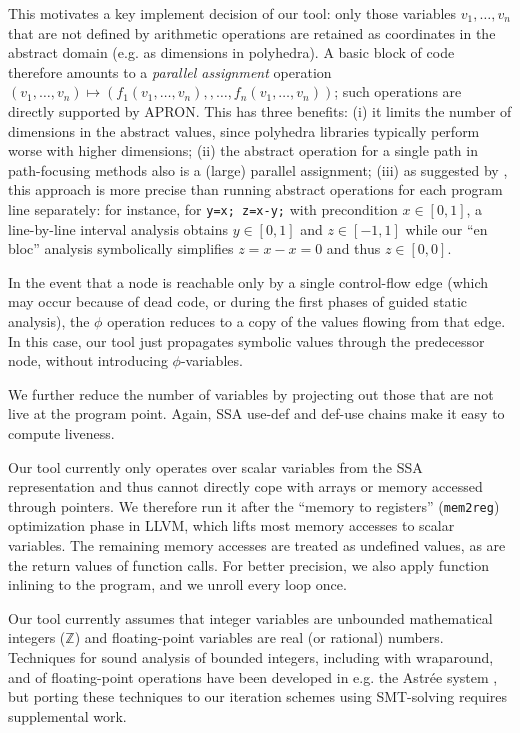\documentclass{llncs}
\newcommand{\ZZ}{\mathbb{Z}}
\begin{document}
This motivates a key implement decision of our tool: only those variables $v_1,\dots,v_n$ that are not defined by arithmetic operations are retained as coordinates in the abstract domain (e.g. as dimensions in polyhedra). A basic block of code therefore amounts to a \emph{parallel assignment} operation
$(v_1,\dots,v_n) \allowbreak\mapsto\allowbreak
(f_1(v_1,\dots,v_n), \allowbreak, \dots, \allowbreak
 f_n(v_1,\dots,v_n))$;
such operations are directly supported by APRON. This has three benefits:
(i) it limits the number of dimensions in the abstract values, since polyhedra libraries typically perform worse with higher dimensions;
(ii) the abstract operation for a single path in path-focusing methods also is a (large) parallel assignment;
(iii) as suggested by \cite{DBLP:conf/vmcai/Mine06}, this approach is more precise than running abstract operations for each program line separately:
for instance, for \lstinline|y=x; z=x-y;| with precondition $x \in [0,1]$, a line-by-line interval analysis obtains $y \in [0,1]$ and $z \in [-1,1]$ while our ``en bloc'' analysis symbolically simplifies $z = x - x = 0$ and thus $z \in [0,0]$.

In the event that a node is reachable only by a single control-flow edge (which may occur because of dead code, or during the first phases of guided static analysis), the $\phi$ operation reduces to a copy of the values flowing from that edge. In this case, our tool just propagates symbolic values through the predecessor node, without introducing $\phi$-variables.

We further reduce the number of variables by projecting out those that are not live at the program point. Again, SSA use-def and def-use chains make it easy to compute liveness.

Our tool currently only operates over scalar variables from the SSA representation and thus cannot directly cope with arrays or memory accessed through pointers. We therefore run it after the ``memory to registers'' (\texttt{mem2reg}) optimization phase in LLVM, which lifts most memory accesses to scalar variables.
The remaining memory accesses are treated as undefined values, as are the return
values of function calls. For better precision, we also apply function inlining
to the program, and we unroll every loop once.

Our tool currently assumes that integer variables are unbounded mathematical integers ($\ZZ$) and floating-point variables are real (or rational) numbers. Techniques for sound analysis of bounded integers, including with wraparound, and of floating-point operations have been developed in e.g. the Astr\'ee system \cite{ASTREE_ESOP05,ASTREE_PLDI03}, but porting these techniques to our iteration schemes using SMT-solving requires supplemental work.
\end{document}
